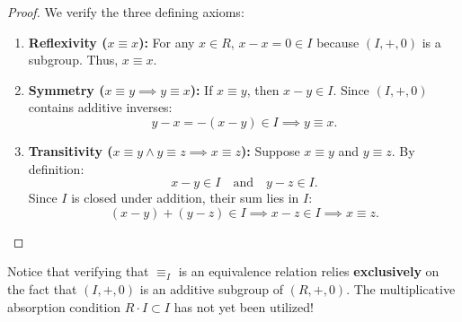 \begin{content}

\begin{proof}
We verify the three defining axioms:
\begin{enumerate}[label=\textbf{(\arabic*)}]
    \item \textbf{Reflexivity ($x \equiv x$):}
    For any $x \in R$, $x - x = 0 \in I$ because $(I, +, 0)$ is a subgroup. Thus, $x \equiv x$.
    \item \textbf{Symmetry ($x \equiv y \implies y \equiv x$):}
    If $x \equiv y$, then $x - y \in I$. Since $(I, +, 0)$ contains additive inverses:
    \[
    y - x = -(x - y) \in I \implies y \equiv x.
    \]
    \item \textbf{Transitivity ($x \equiv y \land y \equiv z \implies x \equiv z$):}
    Suppose $x \equiv y$ and $y \equiv z$. By definition:
    \[
    x - y \in I \quad \text{and} \quad y - z \in I.
    \]
    Since $I$ is closed under addition, their sum lies in $I$:
    \[
    (x - y) + (y - z) \in I \implies x - z \in I \implies x \equiv z.
    \]
\end{enumerate}
\end{proof}

\begin{steps}
Notice that verifying that $\equiv_I$ is an equivalence relation relies \textbf{exclusively} on the fact that $(I, +, 0)$ is an additive subgroup of $(R, +, 0)$. The multiplicative absorption condition $R \cdot I \subset I$ has not yet been utilized!
\end{steps}
\end{content}

\begin{hidden}
\end{hidden}

